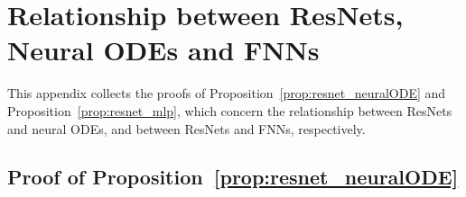 \documentclass[10pt]{article}
\theoremstyle{definition}
\numberwithin{equation}{section}
\begin{document}
    \appendix

    \section{Relationship between ResNets, Neural ODEs and FNNs}
    \label{app:relationship}

    This appendix collects the proofs of Proposition~\ref{prop:resnet_neuralODE} and Proposition~\ref{prop:resnet_mlp}, which concern the relationship between ResNets and neural ODEs, and between ResNets and FNNs, respectively.

    \subsection{Proof of Proposition~\ref{prop:resnet_neuralODE}}
    \label{app:proof_resnet_neuralODE}
\end{document}
